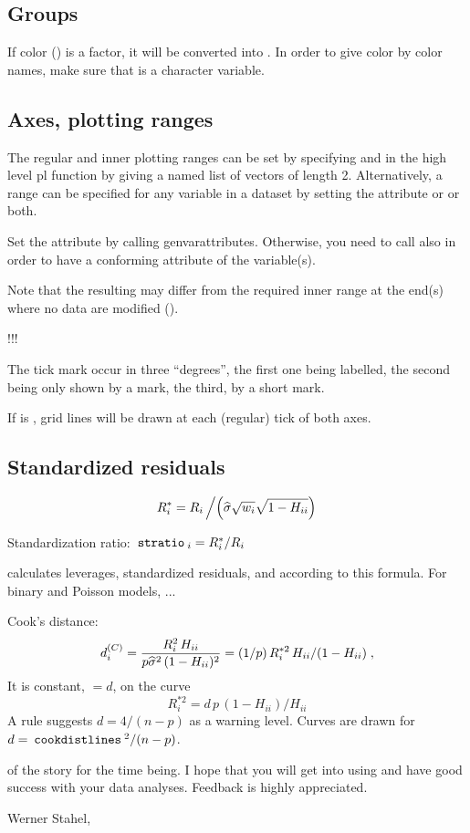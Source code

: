 \documentclass[11pt]{article}\usepackage[]{graphicx}\usepackage[]{color}
\def\wh#1{\widehat{#1}}
\begin{document}
\subsection{Groups}

If color () is a factor, it will be converted into 
.
In order to give color by color names, make sure that  is
a character variable.

\subsection{Axes, plotting ranges}

The regular and inner plotting ranges can be set by specifying
 and  in the high level pl function 
by giving a named list of vectors of length 2.
Alternatively, a range can be specified for any variable in a dataset
by setting the attribute  or
 or both.

Set the  attribute by calling genvarattributes. 
Otherwise, you need to call also  in order to have a conforming
 attribute of the variable(s).

Note that the resulting  may differ from the required 
inner range at the end(s) where no data are modified ().

!!!

The tick mark occur in three ``degrees'', the first one being labelled,
the second being only shown by a mark, the third, by a short mark.

If  is , grid lines will be drawn at each (regular)
tick of both axes.

\subsection{Standardized residuals}

\[
R^*_i=R_i\left/\left(\wh\sigma \sqrt{w_i} \sqrt{1-H_{ii}}\right)\right.
\]

Standardization ratio: 
$\hskip0.5ex\texttt{stratio}\hskip0.5ex_i=R^*_i/R_i$

 calculates leverages, standardized residuals, and 
according to this formula.
For binary and Poisson models, ...

Cook's distance:
\[
  d_i\sups C=\frac{R_i^2\,H_{ii}}{p\wh\sigma^2\,(1-H_{ii})^2}
  =(1/p)\,R_i^{*2}\,H_{ii}/(1-H_{ii})
  \;,
\]
It is constant, $=d$, on the curve
\[
  R_i^{*2} = d\,p\,(1-H_{ii})/H_{ii}
\]
A rule suggests $d=4/(n-p)$ as a warning level.
Curves are drawn for $d=\hskip0.5ex\texttt{cookdistlines}\hskip0.5ex^2/(n-p)$.

{\small
{} of the story for the time being. I hope that you will
get into using  and have good success with your data analyses.
Feedback is highly appreciated.

Werner Stahel, 
}
\end{document}
